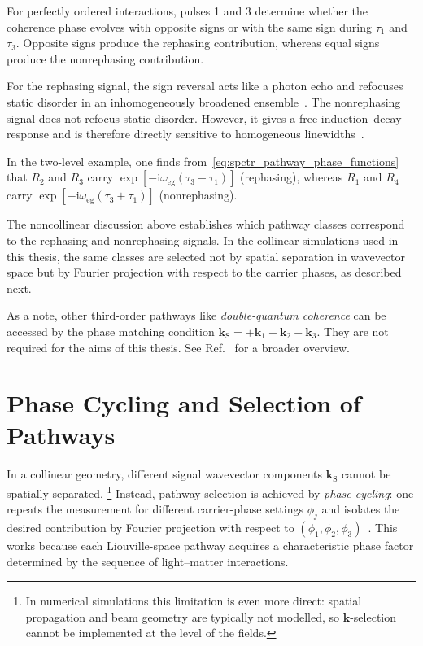 For perfectly ordered interactions, pulses 1 and 3 determine whether the coherence phase evolves with opposite signs or with the same sign during $\tau_1$ and $\tau_3$.
Opposite signs produce the rephasing contribution, whereas equal signs produce the nonrephasing contribution.

For the rephasing signal, the sign reversal acts like a photon echo and refocuses static disorder in an inhomogeneously broadened ensemble~\cite{jonas2003twodimensionalfemtosecondspectroscopy, cho2009twodimensionalopticalspectroscopy, freschetal2023twodimensionalelectronicspectroscopy}.
The nonrephasing signal does not refocus static disorder. However, it gives a free-induction--decay response and is therefore directly sensitive to homogeneous linewidths~\cite{jonas2003twodimensionalfemtosecondspectroscopy}.

In the two-level example, one finds from~\autoref{eq:spctr_pathway_phase_functions} that $R_2$ and $R_3$ carry $\exp[-\mathrm{i}\omega_{\mathrm{eg}}(\tau_3-\tau_1)]$ (rephasing), whereas $R_1$ and $R_4$ carry $\exp[-\mathrm{i}\omega_{\mathrm{eg}}(\tau_3+\tau_1)]$ (nonrephasing).

The noncollinear discussion above establishes which pathway classes correspond to the rephasing and nonrephasing signals. In the collinear simulations used in this thesis, the same classes are selected not by spatial separation in wavevector space but by Fourier projection with respect to the carrier phases, as described next.

As a note, other third-order pathways like \textit{double-quantum coherence} can be accessed by the phase matching condition $\boldsymbol{k}_{\mathrm{S}}=+\boldsymbol{k}_1+\boldsymbol{k}_2-\boldsymbol{k}_3$.
They are not required for the aims of this thesis.
See Ref.~\cite{caietal2024extractingdoublequantumcoherence} for a broader overview.

\section{Phase Cycling and Selection of Pathways}
\label{sec:spctr_phase_cycling}
In a collinear geometry, different signal wavevector components $\boldsymbol{k}_{\mathrm S}$ cannot be spatially separated.%
\footnote{In numerical simulations this limitation is even more direct: spatial propagation and beam geometry are typically not modelled, so $\boldsymbol{k}$-selection cannot be implemented at the level of the fields.}
Instead, pathway selection is achieved by \emph{phase cycling}: one repeats the measurement for different carrier-phase settings $\phi_j$ and isolates the desired contribution by Fourier projection with respect to $(\phi_1,\phi_2,\phi_3)$~\cite{mukamel1995principlesnonlinearoptical, greenetal2024vibrationalcoherenceshalfbroadband}.
This works because each Liouville-space pathway acquires a characteristic phase factor determined by the sequence of light--matter interactions.

